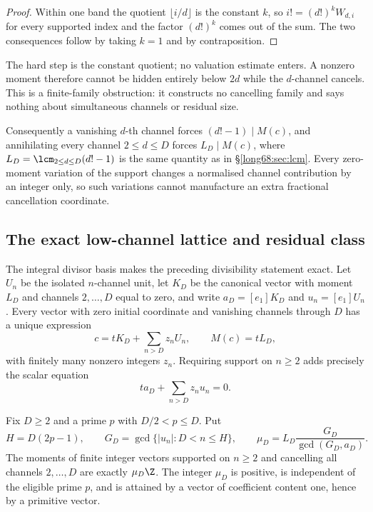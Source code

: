 \documentclass[11pt]{article}
\newcommand{\Lc}{L}
\begin{document}
\begin{proof}
Within one band the quotient $\lfloor i/d\rfloor$ is the constant $k$, so
$i!=(d!)^kW_{d,i}$ for every supported index and the factor $(d!)^k$ comes
out of the sum.  The two consequences follow by taking $k=1$ and by
contraposition.
\end{proof}

\noindent The hard step is the constant quotient; no valuation estimate
enters.  A nonzero moment therefore cannot be hidden entirely below $2d$
while the $d$-channel cancels.  This is a finite-family obstruction: it
constructs no cancelling family and says nothing about simultaneous channels
or residual size.

Consequently a vanishing $d$-th channel forces $(d!-1)\mid M(c)$,
and annihilating every channel $2\le d\le D$ forces $\Lc_D\mid M(c)$, where
$\Lc_D=\lcm_{2\le d\le D}(d!-1)$ is the same quantity as in
\S\ref{long68:sec:lcm}.  Every zero-moment variation of the support changes a
normalised channel contribution by an integer only, so such variations cannot
manufacture an extra fractional cancellation coordinate.

\subsection{The exact low-channel lattice and residual class}

The integral divisor basis makes the preceding divisibility statement exact.
Let $U_n$ be the isolated $n$-channel unit, let $K_D$ be the canonical vector
with moment $L_D$ and channels $2,\ldots,D$ equal to zero, and write
$a_D=[e_1]K_D$ and $u_n=[e_1]U_n$.  Every vector with zero initial coordinate
and vanishing channels through $D$ has a unique expression
\begin{equation}\label{long68:eq:low-channel-basis}
 c=tK_D+\sum_{n>D}z_nU_n,
 \qquad M(c)=tL_D,
\end{equation}
with finitely many nonzero integers $z_n$.  Requiring support on $n\ge2$
adds precisely the scalar equation
\begin{equation}\label{long68:eq:low-channel-support}
 ta_D+\sum_{n>D}z_nu_n=0.
\end{equation}

\begin{theorem}\label{long68:res:moment-ideal}
Fix $D\ge2$ and a prime $p$ with $D/2<p\le D$.  Put
\[
 H=D(2p-1),\qquad
 G_D=\gcd\{|u_n|:D<n\le H\},\qquad
 \mu_D=L_D\frac{G_D}{\gcd(G_D,a_D)}.
\]
The moments of finite integer vectors supported on $n\ge2$ and cancelling all
channels $2,\ldots,D$ are exactly $\mu_D\Z$.  The integer $\mu_D$ is positive,
is independent of the eligible prime $p$, and is attained by a vector of
coefficient content one, hence by a primitive vector.
\end{theorem}
\end{document}
